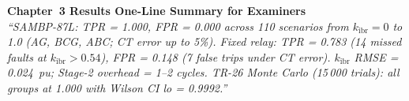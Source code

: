 \documentclass[12pt,a4paper]{article}
\newcommand{\kibr}{k_\mathrm{ibr}}
\begin{document}
\vspace{1em}
\begin{center}
\begin{tcolorbox}[colback=iitmnavy!10,colframe=iitmnavy,arc=4pt,boxrule=1pt,width=0.88\textwidth]
\centering
\textbf{Chapter~3 Results One-Line Summary for Examiners}\\[4pt]
\textit{``SAMBP-87L: TPR = 1.000, FPR = 0.000 across 110 scenarios from $\kibr = 0$ to 1.0 (AG, BCG, ABC; CT error up to 5\%). Fixed relay: TPR = 0.783 (14 missed faults at $\kibr > 0.54$), FPR = 0.148 (7 false trips under CT error). $\kibr$ RMSE = 0.024~pu; Stage-2 overhead = 1--2 cycles. TR-26 Monte Carlo (15\,000 trials): all groups at 1.000 with Wilson CI lo = 0.9992.''}
\end{tcolorbox}
\end{center}
\end{document}
